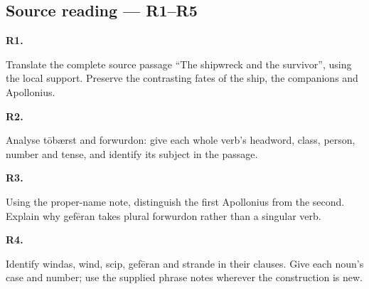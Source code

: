 \subsection*{Source reading — R1–R5}

\par\begin{minipage}{\linewidth}\raggedright
\textbf{R1.}

Translate the complete source passage “The shipwreck and the survivor”, using the local support. Preserve the contrasting fates of the ship, the companions and Apollonius.

\end{minipage}\par\addvspace{4pt}

\par\begin{minipage}{\linewidth}\raggedright
\textbf{R2.}

Analyse tōbærst and forwurdon: give each whole verb’s headword, class, person, number and tense, and identify its subject in the passage.

\end{minipage}\par\addvspace{4pt}

\par\begin{minipage}{\linewidth}\raggedright
\textbf{R3.}

Using the proper-name note, distinguish the first Apollonius from the second. Explain why gefēran takes plural forwurdon rather than a singular verb.

\end{minipage}\par\addvspace{4pt}

\par\begin{minipage}{\linewidth}\raggedright
\textbf{R4.}

Identify windas, wind, scip, gefēran and strande in their clauses. Give each noun’s case and number; use the supplied phrase notes wherever the construction is new.

\end{minipage}\par\addvspace{4pt}

